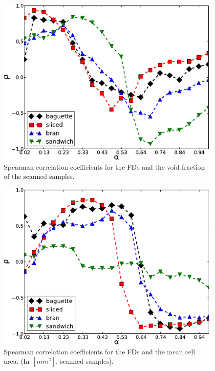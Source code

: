\begin{figure}[h!]
\centering
\includegraphics{VF}
\caption{Spearman correlation coefficients for the FDs and the void fraction of the scanned samples.}
\label{fig:corrVF}
\end{figure}

\begin{figure}[h!]
\centering
\includegraphics{MCA}
\caption{Spearman correlation coefficients for the FDs and the mean cell area. (In $[mm^{2}]$, scanned samples).}
\label{fig:corrMCA}
\end{figure}


